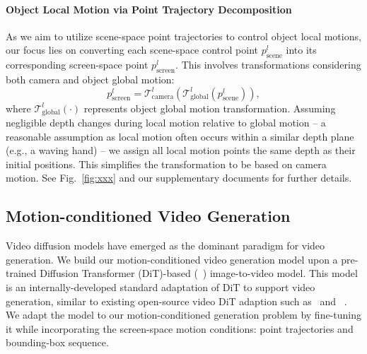 \paragraph{\textbf{Object Local Motion via Point Trajectory Decomposition}}
As we aim to utilize scene-space point trajectories to control object local motions, our focus lies on converting each scene-space control point $p_\text{scene}^l$ into its corresponding screen-space point $p_\text{screen}^l$. This involves transformations considering both camera and object global motion:
\begin{equation}
    p_\text{screen}^l = \mathcal{T}_\text{camera}^l(\mathcal{T}_\text{global}^l(p_\text{scene}^l)),
\end{equation}
where $\mathcal{T}_\text{global}^l(\cdot)$ represents object global motion transformation. Assuming negligible depth changes during local motion relative to global motion – a reasonable assumption as local motion often occurs within a similar depth plane (e.g., a waving hand) – we assign all local motion points the same depth as their initial positions. This simplifies the transformation to be based on camera motion. See Fig.~\ref{fig:xxx} and our supplementary documents for further details.


\subsection{Motion-conditioned Video Generation}
Video diffusion models have emerged as the dominant paradigm for video generation.
We build our motion-conditioned video generation model upon a pre-trained Diffusion Transformer (DiT)-based (~\cite{peebles2023scalable}) image-to-video model.
This model is an internally-developed standard adaptation of DiT to support video generation, similar to existing open-source video DiT adaption such as~\cite{opensora} and ~\cite{yang2024cogvideox}.
We adapt the model to our motion-conditioned generation problem by fine-tuning it while incorporating the screen-space motion conditions: point trajectories and bounding-box sequence.

